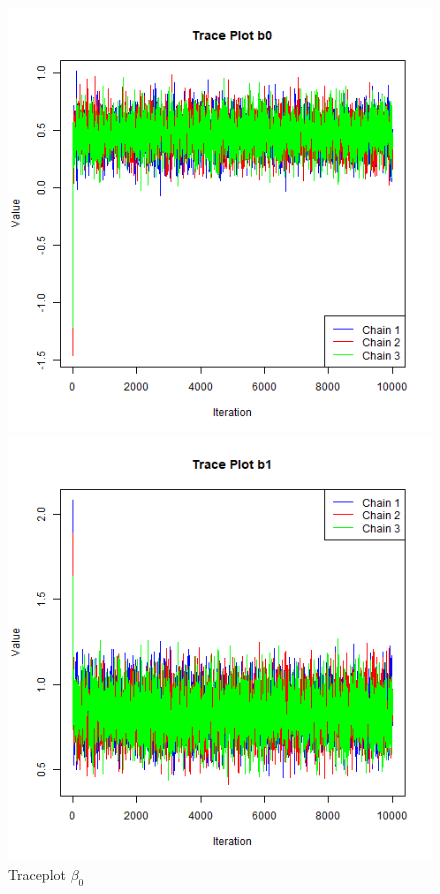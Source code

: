 \documentclass[10.5pt]{article}
\begin{document}
\begin{figure}[htbp]
  \centering
  \begin{minipage}[b]{0.3\textwidth}
    \centering
    \includegraphics[width=\textwidth]{../results/trace_plot_b0.png}
    \caption{Traceplot \(\beta_0\)}
    \label{fig:traceplot1}
  \end{minipage}
  \hfill
  \begin{minipage}[b]{0.3\textwidth}
    \centering
    \includegraphics[width=\textwidth]{../results/trace_plot_b1.png}

\end{minipage}
\end{figure}
\end{document}
